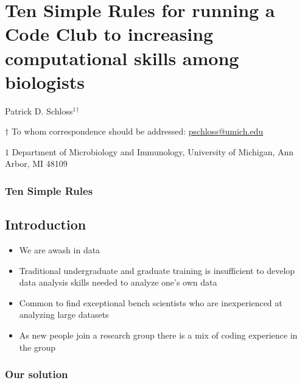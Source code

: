 \documentclass[
  11pt,
]{article}
\author{}
\date{\vspace{-2.5em}}
\providecommand{\tightlist}{%
  \setlength{\itemsep}{0pt}\setlength{\parskip}{0pt}}
\begin{document}
\vspace{10mm}

\hypertarget{ten-simple-rules-for-running-a-code-club-to-increasing-computational-skills-among-biologists}{%
\section{Ten Simple Rules for running a Code Club to increasing
computational skills among
biologists}\label{ten-simple-rules-for-running-a-code-club-to-increasing-computational-skills-among-biologists}}

\vspace{35mm}

Patrick D. Schloss\({^1}\)\({^\dagger}\)

\vspace{40mm}

\(\dagger\) To whom correspondence should be addressed:
\href{mailto:pschloss@umich.edu}{pschloss@umich.edu}

\(1\) Department of Microbiology and Immunology, University of Michigan,
Ann Arbor, MI 48109

\vspace{35mm}

\hypertarget{ten-simple-rules}{%
\subsubsection{Ten Simple Rules}\label{ten-simple-rules}}

\newpage
\linenumbers

\hypertarget{introduction}{%
\subsection{Introduction}\label{introduction}}

\begin{itemize}
\tightlist
\item
  We are awash in data
\item
  Traditional undergraduate and graduate training is insufficient to
  develop data analysis skills needed to analyze one's own data
\item
  Common to find exceptional bench scientists who are inexperienced at
  analyzing large datasets
\item
  As new people join a research group there is a mix of coding
  experience in the group
\end{itemize}

\hypertarget{our-solution}{%
\subsubsection{Our solution}\label{our-solution}}
\end{document}
